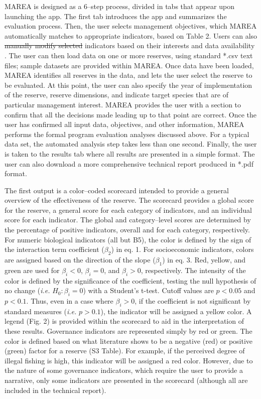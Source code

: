 \documentclass[12pt,]{article}
\providecommand{\DIFaddtex}[1]{{\protect\color{blue}\uwave{#1}}} %
\providecommand{\DIFdeltex}[1]{{\protect\color{red}\sout{#1}}}                      %
\providecommand{\DIFaddbegin}{} %
\providecommand{\DIFaddend}{} %
\providecommand{\DIFdelbegin}{} %
\providecommand{\DIFdelend}{} %
\providecommand{\DIFadd}[1]{\texorpdfstring{\DIFaddtex{#1}}{#1}} %
\providecommand{\DIFdel}[1]{\texorpdfstring{\DIFdeltex{#1}}{}} %
\newcommand{\DIFscaledelfig}{0.5}
\newlength{\DIFdelgraphicswidth} %
\newlength{\DIFdelgraphicsheight} %
\newcommand{\DIFaddincludegraphics}[2][]{{\color{blue}\fbox{\DIFOincludegraphics[#1]{#2}}}} %
\newcommand{\DIFdelincludegraphics}[2][]{%
\sbox{\DIFdelgraphicsbox}{\DIFOincludegraphics[#1]{#2}}%
\settoboxwidth{\DIFdelgraphicswidth}{\DIFdelgraphicsbox} %
\settoboxtotalheight{\DIFdelgraphicsheight}{\DIFdelgraphicsbox} %
\scalebox{\DIFscaledelfig}{%
\parbox[b]{\DIFdelgraphicswidth}{\usebox{\DIFdelgraphicsbox}\\[-\baselineskip] \rule{\DIFdelgraphicswidth}{0em}}\llap{\resizebox{\DIFdelgraphicswidth}{\DIFdelgraphicsheight}{%
\setlength{\unitlength}{\DIFdelgraphicswidth}%
\begin{picture}(1,1)%
\thicklines\linethickness{2pt} %
{\color[rgb]{1,0,0}\put(0,0){\framebox(1,1){}}}%
{\color[rgb]{1,0,0}\put(0,0){\line( 1,1){1}}}%
{\color[rgb]{1,0,0}\put(0,1){\line(1,-1){1}}}%
\end{picture}%
}\hspace*{3pt}}} %
} %
\DeclareRobustCommand{\DIFaddbegin}{\DIFOaddbegin \let\includegraphics\DIFaddincludegraphics} %
\DeclareRobustCommand{\DIFaddend}{\DIFOaddend \let\includegraphics\DIFOincludegraphics} %
\DeclareRobustCommand{\DIFdelbegin}{\DIFOdelbegin \let\includegraphics\DIFdelincludegraphics} %
\DeclareRobustCommand{\DIFdelend}{\DIFOaddend \let\includegraphics\DIFOincludegraphics} %
\begin{document}
MAREA is designed as a 6--step process, divided in tabs that appear upon
launching the app. The first tab introduces the app and summarizes the
evaluation process. Then, the user selects management objectives, which
MAREA automatically matches to appropriate indicators, based on Table 2.
Users can also \DIFdelbegin \DIFdel{manually modify selected }\DIFdelend \DIFaddbegin \DIFadd{select and deselect }\DIFaddend indicators based on their interests
and data availability \DIFaddbegin \DIFadd{by ``clicking'' on the check-boxes in MAREA}\DIFaddend . The
user can then load data on one or more reserves, using standard *.csv
text files; sample datasets are provided within MAREA. Once data have
been loaded, MAREA identifies all reserves in the data, and lets the
user select the reserve to be evaluated. At this point, the user can
also specify the year of implementation of the reserve, reserve
dimensions, and indicate target species that are of particular
management interest. MAREA provides the user with a section to confirm
that all the decisions made leading up to that point are correct. Once
the user has confirmed all input data, objectives, and other
information, MAREA performs the formal program evaluation analyses
discussed above. For a typical data set, the automated analysis step
takes less than one second. Finally, the user is taken to the results
tab where all results are presented in a simple format. The user can
also download a more comprehensive technical report produced in *.pdf
format.

The first output is a color--coded scorecard intended to provide a
general overview of the effectiveness of the reserve. The scorecard
provides a global score for the reserve, a general score for each
category of indicators, and an individual score for each indicator. The
global and category--level scores are determined by the percentage of
positive indicators, overall and for each category, respectively. For
numeric biological indicators (all but B5), the color is defined by the
sign of the interaction term coefficient (\(\beta_2\)) in eq. 1. For
socioeconomic indicators, colors are assigned based on the direction of
the slope (\(\beta_1\)) in eq. 3. Red, yellow, and green are used for
\(\beta_i<0\), \(\beta_i = 0\), and \(\beta_i>0\), respectively. The
intensity of the color is defined by the significance of the
coefficient, testing the null hypothesis of no change (\emph{i.e.}
\(H_0: \beta_i = 0\)) with a Student's t-test. Cutoff values are
\(p < 0.05\) and \(p < 0.1\). Thus, even in a case where
\(\beta_i > 0\), if the coefficient is not significant by standard
measures (\emph{i.e. } \(p>0.1\)), the indicator will be assigned a
yellow color. A legend (Fig. 2) is provided within the scorecard to aid
in the interpretation of these results. Governance indicators are
represented simply by red or green. The color is defined based on what
literature shows to be a negative (red) or positive (green) factor for a
reserve (S3 Table). For example, if the perceived degree of illegal
fishing is high, this indicator will be assigned a red color. However,
due to the nature of some governance indicators, which require the user
to provide a narrative, only some indicators are presented in the
scorecard (although all are included in the technical report).
\end{document}
